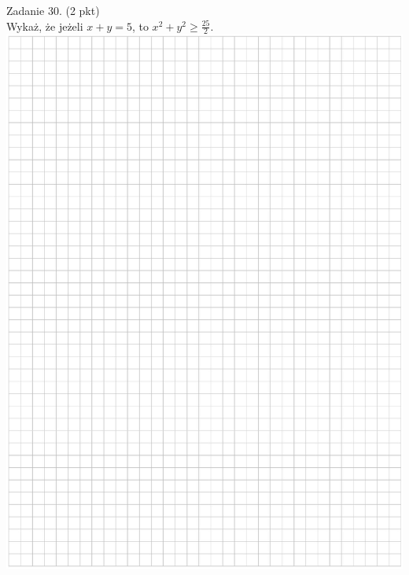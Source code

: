 \documentclass[10pt]{article}
\begin{document}
Zadanie 30. (2 pkt)\\
Wykaż, że jeżeli \(x+y=5\), to \(x^{2}+y^{2} \geq \frac{25}{2}\).\\
\includegraphics[max width=\textwidth, center]{2024_11_21_b31e6de468170710de69g-13}
\end{document}
